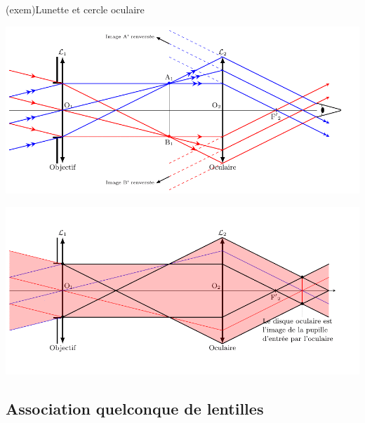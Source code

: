 \documentclass[../../main/main.tex]{subfiles}
\begin{document}
\begin{tcb}[label=exem:co](exem){Lunette et cercle oculaire}
	\begin{center}
		\includegraphics[width=.83\linewidth]{kepler_2obj}
	\end{center}
	\tcblower
	\begin{center}
		\includegraphics[width=.83\linewidth]{kepler_co}
	\end{center}
\end{tcb}

\subsection*{Association quelconque de lentilles}
\end{document}
